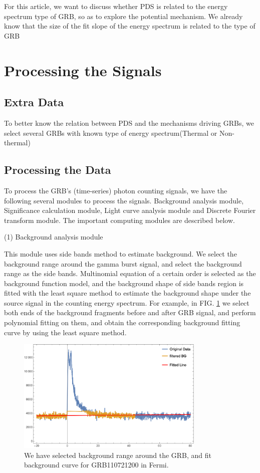 \documentclass[prd,10pt]{revtex4-2}
\begin{document}
For this article, we want to discuss whether PDS is related to the energy spectrum type of GRB, so as to explore the potential mechanism. We already know that the size of the fit slope of the energy spectrum is related to the type of GRB \cite{ghirlanda_extremely_2003}


\section{Processing the Signals}

\subsection{Extra Data}

To better know the relation between PDS and the mechanisms driving GRBs, we select several GRBs with known type of energy spectrum(Thermal or Non-thermal)

\subsection{Processing the Data}

To process the GRB's (time-series) photon counting signals, we have the following several modules to process the signals. Background analysis module, Significance calculation module, Light curve analysis module and Discrete Fourier transform module. The important computing modules are described below.

(1) Background analysis module

This module uses side bands method to estimate background. We select the background range around the gamma burst signal, and select the background range as the side bands. Multinomial equation of a certain order is selected as the background function model, and the background shape of side bands region is fitted with the least square method to estimate the background shape under the source signal in the counting energy spectrum. For example, in FIG. \ref{fig:bg.png} we select both ends of the background fragments before and after GRB signal, and perform polynomial fitting on them, and obtain the corresponding background fitting curve by using the least square method.

\begin{figure}[ht]
    \centering
    \includegraphics[width= 0.8\textwidth]{bg.png}
    \caption{\label{fig:bg.png}
        We have selected background range around the GRB, and fit background curve for  GRB110721200 in Fermi.
    }
\end{figure}
\end{document}
